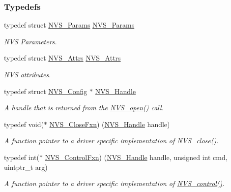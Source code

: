 \subsubsection*{Typedefs}
\begin{DoxyCompactItemize}
\item 
typedef struct \hyperlink{struct_n_v_s___params}{N\+V\+S\+\_\+\+Params} \hyperlink{_n_v_s_8h_a00d64340188bed30cc27be46cf8a5aa4}{N\+V\+S\+\_\+\+Params}
\begin{DoxyCompactList}\small\item\em N\+V\+S Parameters. \end{DoxyCompactList}\item 
typedef struct \hyperlink{struct_n_v_s___attrs}{N\+V\+S\+\_\+\+Attrs} \hyperlink{_n_v_s_8h_a28426a848b1ff2a02474ea663856345f}{N\+V\+S\+\_\+\+Attrs}
\begin{DoxyCompactList}\small\item\em N\+V\+S attributes. \end{DoxyCompactList}\item 
typedef struct \hyperlink{struct_n_v_s___config}{N\+V\+S\+\_\+\+Config} $\ast$ \hyperlink{_n_v_s_8h_a1ee0bd7b3cd443236454a8cb1f56ad44}{N\+V\+S\+\_\+\+Handle}
\begin{DoxyCompactList}\small\item\em A handle that is returned from the \hyperlink{_n_v_s_8h_ad3a3d1f1477312eeee6d2c907a25bd67}{N\+V\+S\+\_\+open()} call. \end{DoxyCompactList}\item 
typedef void($\ast$ \hyperlink{_n_v_s_8h_a82f2a5311bf6dc69d62046fe20c3e108}{N\+V\+S\+\_\+\+Close\+Fxn}) (\hyperlink{_n_v_s_8h_a1ee0bd7b3cd443236454a8cb1f56ad44}{N\+V\+S\+\_\+\+Handle} handle)
\begin{DoxyCompactList}\small\item\em A function pointer to a driver specific implementation of \hyperlink{_n_v_s_8h_a12147fcc41f532802d97c0784c3e30c3}{N\+V\+S\+\_\+close()}. \end{DoxyCompactList}\item 
typedef int($\ast$ \hyperlink{_n_v_s_8h_a893a6b6ea0d408e348267109f3aa2736}{N\+V\+S\+\_\+\+Control\+Fxn}) (\hyperlink{_n_v_s_8h_a1ee0bd7b3cd443236454a8cb1f56ad44}{N\+V\+S\+\_\+\+Handle} handle, unsigned int cmd, uintptr\+\_\+t arg)
\begin{DoxyCompactList}\small\item\em A function pointer to a driver specific implementation of \hyperlink{_n_v_s_8h_adb26bd05e4f063191411ac5ad968b1d9}{N\+V\+S\+\_\+control()}. \end{DoxyCompactList}\item 

\end{DoxyCompactItemize}
